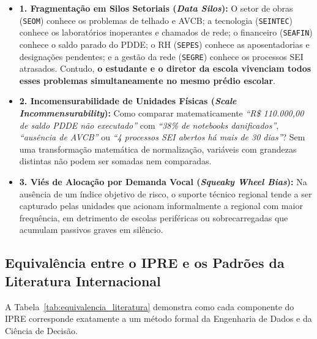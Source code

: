 \documentclass[9pt,a4paper]{extarticle}
\begin{document}
\begin{itemize}[leftmargin=1.5em, itemsep=4pt]
    \item \textbf{1. Fragmentação em Silos Setoriais (\emph{Data Silos}):} O setor de obras (\texttt{SEOM}) conhece os problemas de telhado e AVCB; a tecnologia (\texttt{SEINTEC}) conhece os laboratórios inoperantes e chamados de rede; o financeiro (\texttt{SEAFIN}) conhece o saldo parado do PDDE; o RH (\texttt{SEPES}) conhece as aposentadorias e designações pendentes; e a gestão da rede (\texttt{SEGRE}) conhece os processos SEI atrasados. Contudo, \textbf{o estudante e o diretor da escola vivenciam todos esses problemas simultaneamente no mesmo prédio escolar}.
    \item \textbf{2. Incomensurabilidade de Unidades Físicas (\emph{Scale Incommensurability}):} Como comparar matematicamente \emph{``R\$ 110.000,00 de saldo PDDE não executado''} com \emph{``38\% de notebooks danificados''}, \emph{``ausência de AVCB''} ou \emph{``4 processos SEI abertos há mais de 30 dias''}? Sem uma transformação matemática de normalização, variáveis com grandezas distintas não podem ser somadas nem comparadas.
    \item \textbf{3. Viés de Alocação por Demanda Vocal (\emph{Squeaky Wheel Bias}):} Na ausência de um índice objetivo de risco, o suporte técnico regional tende a ser capturado pelas unidades que acionam informalmente a regional com maior frequência, em detrimento de escolas periféricas ou sobrecarregadas que acumulam passivos graves em silêncio.
\end{itemize}

\subsection{Equivalência entre o IPRE e os Padrões da Literatura Internacional}

A Tabela~\ref{tab:equivalencia_literatura} demonstra como cada componente do IPRE corresponde exatamente a um método formal da Engenharia de Dados e da Ciência de Decisão.
\end{document}
